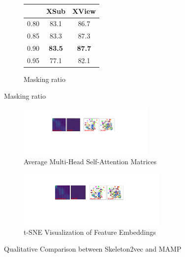\begin{figure}[tb]
\begin{subfigure}[t]{0.24\linewidth}
\begin{tabular}{c c c}
            & XSub & XView \\
            \midrule
            0.80 & 83.1 & 86.7 \\
            0.85 & 83.3 & 87.3 \\
            0.90 & \textbf{83.5} & \textbf{87.7} \\
            0.95 & 77.1 & 82.1 \\
            \bottomrule
        \end{tabular}
        \caption{Masking ratio}
        \label{tab:masking_ratio}
    \end{subfigure}
    \label{tab:masking_ratio_and_beta}
    \vspace{-4pt}
\end{figure}

\begin{figure}[tb]
    \begin{subfigure}[b]{0.48\textwidth}
      \centering
        \includegraphics[width=0.73\textwidth]{figures/fig_qua_matrice.pdf}
        \caption{
          Average Multi-Head Self-Attention Matrices
        }
        \label{fig:qua_matrice}
    \end{subfigure}
    \hfill
    \begin{subfigure}[b]{0.48\textwidth}
      \centering
        \includegraphics[width=0.8\textwidth]{figures/fig_qua_feat.pdf}
        \caption{
          t-SNE Visualization of Feature Embeddings
        }
        \label{fig:qua_feat}
    \end{subfigure}
    \caption{
      Qualitative Comparison between Skeleton2vec and MAMP
    }
    \label{fig:qualitative}
    \vspace{-8pt}
\end{figure}

